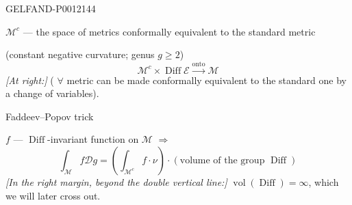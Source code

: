 \begin{GelfandAdjacentEvidence}{GELFAND-P001214}{4}


\(\mathcal M^c\) --- the space of metrics conformally equivalent to the standard metric

(constant negative curvature; genus \(g\geq2\))
\begin{equation*}
\mathcal M^c\times\operatorname{Diff}\mathcal E\overset{\text{onto}}{\longrightarrow}\mathcal M\tag{6}
\end{equation*}
\textit{[At right:]} ( \(\forall\) metric can be made conformally equivalent to the standard one by a change of variables).

Faddeev--Popov trick

\(f\) --- \(\operatorname{Diff}\)-invariant function on \(\mathcal M\) \(\Rightarrow\)
\begin{equation*}
\int_{\mathcal M}f\mathcal Dg
=\left(\int_{\mathcal M^c}f\cdot\nu\right)\cdot
\left(\text{volume of the group }\operatorname{Diff}\right)\tag{7}
\end{equation*}
\textit{[In the right margin, beyond the double vertical line:]} \(\operatorname{vol}(\operatorname{Diff})=\infty\), which we will later cross out.
\end{GelfandAdjacentEvidence}
